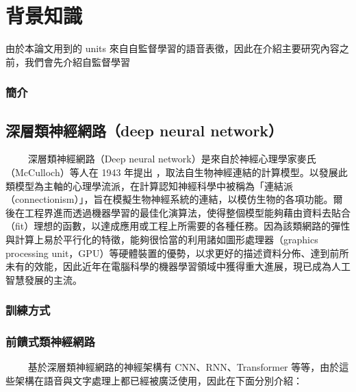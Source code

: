 

\chapter{背景知識}

由於本論文用到的 units 來自自監督學習的語音表徵，因此在介紹主要研究內容之前，我們會先介紹自監督學習 

\subsection{簡介}

\section{深層類神經網路（deep neural network）}

　　
深層類神經網路（Deep neural network）是來自於神經心理學家麥氏（McCulloch）等人在 1943 年提出 \cite{mcculloch1943logical}，取法自生物神經連結的計算模型。以發展此類模型為主軸的心理學流派，在計算認知神經科學中被稱為「連結派（connectionism）」，旨在模擬生物神經系統的連結，以模仿生物的各項功能。爾後在工程界進而透過機器學習的最佳化演算法，使得整個模型能夠藉由資料去貼合（fit）理想的函數，以達成應用或工程上所需要的各種任務。因為該類網路的彈性與計算上易於平行化的特徵，能夠很恰當的利用諸如圖形處理器（graphics processing unit，GPU）等硬體裝置的優勢，以求更好的描述資料分佈、達到前所未有的效能，因此近年在電腦科學的機器學習領域中獲得重大進展，現已成為人工智慧發展的主流。




\subsection{訓練方式}

\subsection{前饋式類神經網路}　　
基於深層類神經網路的神經架構有 CNN、RNN、Transformer 等等，由於這些架構在語音與文字處理上都已經被廣泛使用，因此在下面分別介紹：

